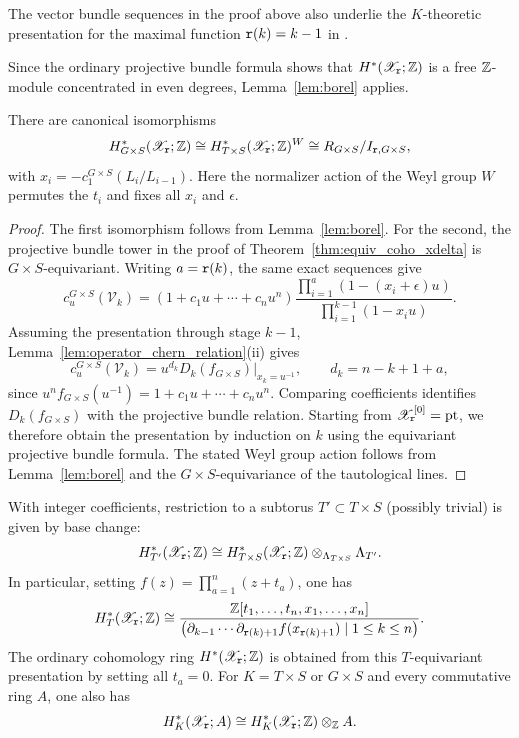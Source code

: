 The vector bundle sequences in the proof above also underlie the $K$-theoretic
presentation for the maximal function $\mathtt r(k)=k-1$ in
\cite[Lemmas~8.13--8.14]{cautis2018quantum}.

Since the ordinary projective bundle formula shows that $H^*(\mathscr X_{\mathtt r};\mathbb Z)$
is a free $\mathbb Z$-module concentrated in even degrees, Lemma~\ref{lem:borel} applies.

\begin{corollary}\label{cor:equiv_coho_xdelta_G}
There are canonical isomorphisms
\[
  H^*_{G\times S}(\mathscr X_{\mathtt r};\mathbb Z)
  \cong H^*_{T\times S}(\mathscr X_{\mathtt r};\mathbb Z)^W
  \cong R_{G\times S}/I_{\mathtt r,G\times S},
\]
with $x_i=-c_1^{G\times S}(L_i/L_{i-1})$.
Here the normalizer action of the Weyl group $W$ permutes the $t_i$ and fixes all
$x_i$ and $\epsilon$.
\end{corollary}

\begin{proof}
The first isomorphism follows from Lemma~\ref{lem:borel}.
For the second, the projective bundle tower in the proof of
Theorem~\ref{thm:equiv_coho_xdelta} is $G\times S$-equivariant.
Writing $a=\mathtt r(k)$, the same exact sequences give
\[
 c_u^{G\times S}(\mathscr V_k)
 =(1+c_1u+\cdots+c_nu^n)
 \frac{\prod_{i=1}^{a}(1-(x_i+\epsilon)u)}
      {\prod_{i=1}^{k-1}(1-x_i u)}.
\]
Assuming the presentation through stage $k-1$,
Lemma~\ref{lem:operator_chern_relation}(ii) gives
\[
 c_u^{G\times S}(\mathscr V_k)
 =u^{d_k}D_k(f_{G\times S})\big|_{x_k=u^{-1}},
 \qquad d_k=n-k+1+a,
\]
since $u^nf_{G\times S}(u^{-1})=1+c_1u+\cdots+c_nu^n$.
Comparing coefficients identifies $D_k(f_{G\times S})$ with the projective
bundle relation. Starting from $\mathscr X_{\mathtt r}^{[0]}=\mathrm{pt}$, we therefore obtain
the presentation by induction on $k$ using the equivariant projective bundle formula.
The stated Weyl group action follows from Lemma~\ref{lem:borel} and the
$G\times S$-equivariance of the tautological lines.
\end{proof}

\begin{corollary}\label{cor:coho_xdelta_R}
With integer coefficients, restriction to a subtorus $T'\subset T\times S$ (possibly trivial) is given by base change:
\[
 H^*_{T'}(\mathscr X_{\mathtt r};\mathbb Z)
 \cong H^*_{T\times S}(\mathscr X_{\mathtt r};\mathbb Z)
       \otimes_{\Lambda_{T\times S}}\Lambda_{T'}.
\]
In particular, setting $f(z)=\prod_{a=1}^n(z+t_a)$, one has
\[
 H_T^*(\mathscr X_{\mathtt r};\mathbb Z)
 \cong\frac{\mathbb Z[t_1,\dots,t_n,x_1,\dots,x_n]}
 {\bigl(\partial_{k-1}\cdots\partial_{\mathtt r(k)+1}
                      f(x_{\mathtt r(k)+1})\mid1\leq k\leq n\bigr)}.
\]
The ordinary cohomology ring $H^*(\mathscr X_{\mathtt r};\mathbb Z)$ is obtained from this $T$-equivariant presentation by setting all $t_a=0$.
For $K=T\times S$ or $G\times S$ and every commutative ring $A$, one also has
\[
 H_K^*(\mathscr X_{\mathtt r};A)
 \cong H_K^*(\mathscr X_{\mathtt r};\mathbb Z)\otimes_\mathbb Z A.
\]
\end{corollary}

